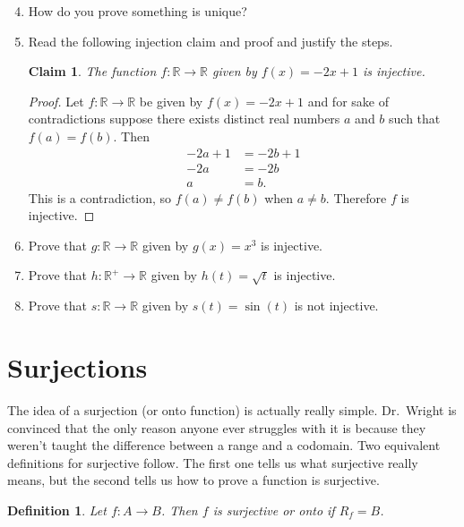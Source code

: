 \documentclass[12 pt]{article}
\newcommand{\R}{\mathbb{R}}
\theoremstyle{definition}
\theoremstyle{plain}
\theoremstyle{mytheorem}
\newtheorem{claim}{Claim}
\theoremstyle{myexample}
\theoremstyle{mydefinition}
\newtheorem*{definition*}{Definition}
\begin{document}
\begin{enumerate} \setcounter{enumi}{3}
\item How do you prove something is unique?

\vspace{1.5in}

\item Read the following injection claim and proof and justify the steps.
\begin{claim}
The function $f: \R \to \R$ given by $f(x)=-2x+1$ is injective.
\end{claim}
\begin{proof}  Let $f: \R \to \R$ be given by $f(x) = -2x+1$ and for sake of contradictions suppose there exists distinct real numbers $a$ and $b$ such that $f(a)=f(b)$.  Then
	\begin{align*}
	-2a+1 &= -2b+1 \\
	-2a &= -2b \\
	a &= b.
	\end{align*}
	This is a contradiction, so $f(a) \neq f(b)$ when $a \neq b$.  Therefore $f$ is injective.
\end{proof}
\item Prove that $g: \R \to \R$ given by $g(x) = x^3$ is injective.

\vspace{2.5in}
\item Prove that $h: \R^+ \to \R$ given by $h(t) = \sqrt{t}$ is injective.

\vspace{2.5in}
\item Prove that $s: \R \to \R$ given by $s(t) = \sin(t)$ is not injective.

\vspace{2.5in}
\end{enumerate}

\section{Surjections}

The idea of a surjection (or onto function) is actually really simple.  Dr.~Wright is convinced that the only reason anyone ever struggles with it is because they weren't taught the difference between a range and a codomain.  Two equivalent definitions for surjective follow.  The first one tells us what surjective really means, but the second tells us how to prove a function is surjective.
\begin{definition*}  Let $f: A \to B$.  Then $f$ is \textit{surjective} or \textit{onto} if $R_f = B$.
\end{definition*}
\end{document}

